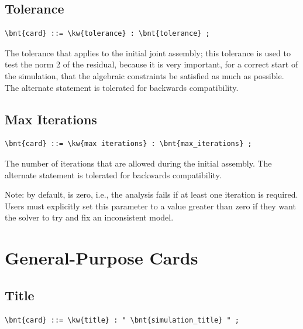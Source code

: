 \subsection{Tolerance}
\begin{Verbatim}[commandchars=\\\{\}]
    \bnt{card} ::= \kw{tolerance} : \bnt{tolerance} ;
\end{Verbatim}
The tolerance that applies to the initial joint assembly; 
this tolerance is used to test the norm 2 of the residual,
because it is very important, for a correct start of the simulation,
that the algebraic constraints be satisfied as much as possible.
The alternate statement  is tolerated 
for backwards compatibility.

\subsection{Max Iterations}
\begin{Verbatim}[commandchars=\\\{\}]
    \bnt{card} ::= \kw{max iterations} : \bnt{max_iterations} ;
\end{Verbatim}
The number of iterations that are allowed during the initial assembly.
The alternate statement  is tolerated
for backwards compatibility.

Note: by default,  is zero, i.e., the analysis fails if at least one iteration is required.
Users must explicitly set this parameter to a value greater than zero if they want the solver to try and fix an inconsistent model.



\section{General-Purpose Cards}

\subsection{Title}
\begin{Verbatim}[commandchars=\\\{\}]
    \bnt{card} ::= \kw{title} : " \bnt{simulation_title} " ;
\end{Verbatim}

